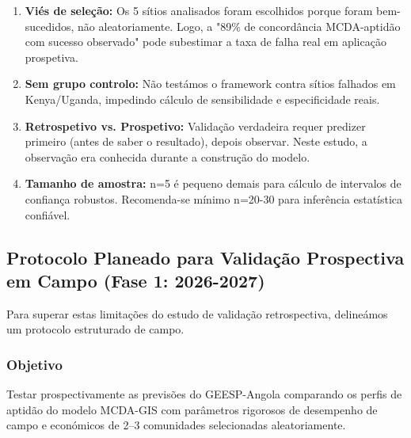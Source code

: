 \documentclass[12pt, a4paper]{article}
\begin{document}
\begin{enumerate}
\item \textbf{Viés de seleção:} Os 5 sítios analisados foram escolhidos porque foram bem-sucedidos, não aleatoriamente. Logo, a "89\% de concordância MCDA-aptidão com sucesso observado" pode subestimar a taxa de falha real em aplicação prospetiva.

\item \textbf{Sem grupo controlo:} Não testámos o framework contra sítios falhados em Kenya/Uganda, impedindo cálculo de sensibilidade e especificidade reais.

\item \textbf{Retrospetivo vs. Prospetivo:} Validação verdadeira requer predizer primeiro (antes de saber o resultado), depois observar. Neste estudo, a observação era conhecida durante a construção do modelo.

\item \textbf{Tamanho de amostra:} n=5 é pequeno demais para cálculo de intervalos de confiança robustos. Recomenda-se mínimo n=20-30 para inferência estatística confiável.
\end{enumerate}

\subsection{Protocolo Planeado para Validação Prospectiva em Campo (Fase 1: 2026-2027)}

Para superar estas limitações do estudo de validação retrospectiva, delineámos um protocolo estruturado de campo.

\subsubsection{Objetivo}
Testar prospectivamente as previsões do GEESP-Angola comparando os perfis de aptidão do modelo MCDA-GIS com parâmetros rigorosos de desempenho de campo e económicos de 2–3 comunidades selecionadas aleatoriamente.
\end{document}
